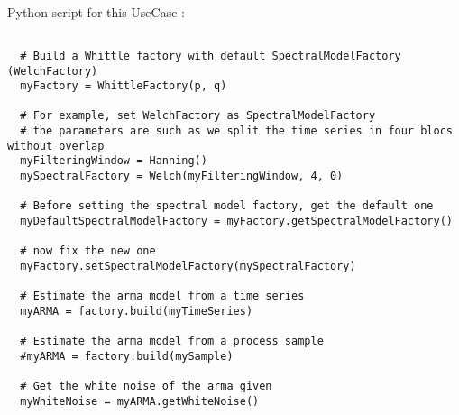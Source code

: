 \textspace\\
Python script for this UseCase :

\begin{lstlisting}

  # Build a Whittle factory with default SpectralModelFactory (WelchFactory)
  myFactory = WhittleFactory(p, q)

  # For example, set WelchFactory as SpectralModelFactory
  # the parameters are such as we split the time series in four blocs without overlap
  myFilteringWindow = Hanning()
  mySpectralFactory = Welch(myFilteringWindow, 4, 0)
  
  # Before setting the spectral model factory, get the default one
  myDefaultSpectralModelFactory = myFactory.getSpectralModelFactory()

  # now fix the new one
  myFactory.setSpectralModelFactory(mySpectralFactory)

  # Estimate the arma model from a time series
  myARMA = factory.build(myTimeSeries)

  # Estimate the arma model from a process sample
  #myARMA = factory.build(mySample)

  # Get the white noise of the arma given
  myWhiteNoise = myARMA.getWhiteNoise()

\end{lstlisting}

